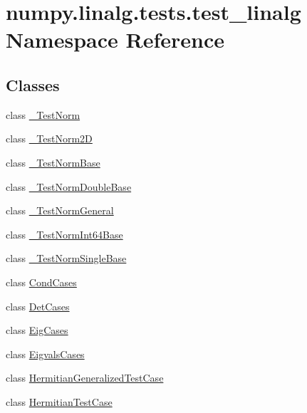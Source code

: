 \hypertarget{namespacenumpy_1_1linalg_1_1tests_1_1test__linalg}{}\section{numpy.\+linalg.\+tests.\+test\+\_\+linalg Namespace Reference}
\label{namespacenumpy_1_1linalg_1_1tests_1_1test__linalg}
\subsection*{Classes}
\begin{DoxyCompactItemize}
\item 
class \hyperlink{classnumpy_1_1linalg_1_1tests_1_1test__linalg_1_1__TestNorm}{\+\_\+\+Test\+Norm}
\item 
class \hyperlink{classnumpy_1_1linalg_1_1tests_1_1test__linalg_1_1__TestNorm2D}{\+\_\+\+Test\+Norm2D}
\item 
class \hyperlink{classnumpy_1_1linalg_1_1tests_1_1test__linalg_1_1__TestNormBase}{\+\_\+\+Test\+Norm\+Base}
\item 
class \hyperlink{classnumpy_1_1linalg_1_1tests_1_1test__linalg_1_1__TestNormDoubleBase}{\+\_\+\+Test\+Norm\+Double\+Base}
\item 
class \hyperlink{classnumpy_1_1linalg_1_1tests_1_1test__linalg_1_1__TestNormGeneral}{\+\_\+\+Test\+Norm\+General}
\item 
class \hyperlink{classnumpy_1_1linalg_1_1tests_1_1test__linalg_1_1__TestNormInt64Base}{\+\_\+\+Test\+Norm\+Int64\+Base}
\item 
class \hyperlink{classnumpy_1_1linalg_1_1tests_1_1test__linalg_1_1__TestNormSingleBase}{\+\_\+\+Test\+Norm\+Single\+Base}
\item 
class \hyperlink{classnumpy_1_1linalg_1_1tests_1_1test__linalg_1_1CondCases}{Cond\+Cases}
\item 
class \hyperlink{classnumpy_1_1linalg_1_1tests_1_1test__linalg_1_1DetCases}{Det\+Cases}
\item 
class \hyperlink{classnumpy_1_1linalg_1_1tests_1_1test__linalg_1_1EigCases}{Eig\+Cases}
\item 
class \hyperlink{classnumpy_1_1linalg_1_1tests_1_1test__linalg_1_1EigvalsCases}{Eigvals\+Cases}
\item 
class \hyperlink{classnumpy_1_1linalg_1_1tests_1_1test__linalg_1_1HermitianGeneralizedTestCase}{Hermitian\+Generalized\+Test\+Case}
\item 
class \hyperlink{classnumpy_1_1linalg_1_1tests_1_1test__linalg_1_1HermitianTestCase}{Hermitian\+Test\+Case}

\end{DoxyCompactItemize}
